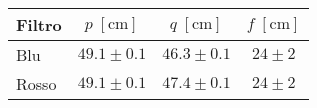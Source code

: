 \begin{table}[H]
    \centering
    \small
    \begin{tabular}{l c c c}
        \toprule
		Filtro & $p \; [\si{\centi\metre}]$ & $q \; [\si{\centi\metre}]$ & $f \; [\si{\centi\metre}]$ \\
        \midrule
		Blu & $49.1 \pm 0.1 $ & $46.3 \pm 0.1$ & $24 \pm 2$ \\
		Rosso & $49.1 \pm 0.1$ & $47.4 \pm 0.1$ & $24 \pm 2$ \\
        \bottomrule
    \end{tabular}
\end{table}
